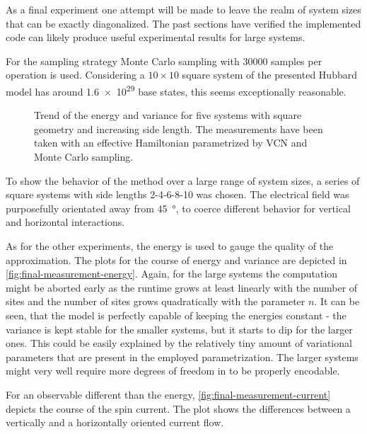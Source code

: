 As a final experiment one attempt will be made to leave the realm of system sizes that can be exactly diagonalized.
The past sections have verified the implemented code can likely produce useful experimental results for large systems.

For the sampling strategy Monte Carlo sampling with \num{30000} samples per operation is used.
Considering a $10\times{}10$ square system of the presented Hubbard model has around \num{1.6e29} base states, this seems exceptionally reasonable.

\begin{figure}[htbp]
    \centering
    \vspace{-0.3cm}
    \caption{
            Trend of the energy and variance for five systems with square geometry and increasing side length.
            The measurements have been taken with an effective Hamiltonian parametrized by VCN and Monte Carlo sampling.
        }
    \label{fig:final-measurement-energy}
\end{figure}

To show the behavior of the method over a large range of system sizes, a series of square systems with side lengths 2-4-6-8-10 was chosen.
The electrical field was purposefully orientated away from \SI{45}{\degree}, to coerce different behavior for vertical and horizontal interactions.

As for the other experiments, the energy is used to gauge the quality of the approximation. 
The plots for the course of energy and variance are depicted in \autoref{fig:final-measurement-energy}.
Again, for the large systems the computation might be aborted early as the runtime grows at least linearly with the number of sites and the number of sites grows quadratically with the parameter $n$.
It can be seen, that the model is perfectly capable of keeping the energies constant - the variance is kept stable for the smaller systems, but it starts to dip for the larger ones.
This could be easily explained by the relatively tiny amount of variational parameters that are present in the employed parametrization.
The larger systems might very well require more degrees of freedom in \Hvcn{\vec{\eta}} to be properly encodable.

For an observable different than the energy, \autoref{fig:final-measurement-current} depicts the course of the spin current.
The plot shows the differences between a vertically and a horizontally oriented current flow.

